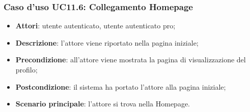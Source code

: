 \subsubsection{Caso d'uso UC11.6: Collegamento Homepage}
\begin{itemize}
\item\textbf{Attori}: utente autenticato, utente autenticato pro;
\item\textbf{Descrizione}: l'attore viene riportato nella pagina iniziale;
\item\textbf{Precondizione}: all'attore viene mostrata la pagina di visualizzazione del profilo;
\item\textbf{Postcondizione}: il sistema ha portato l'attore alla pagina iniziale;
\item\textbf{Scenario principale}: l'attore si trova nella Homepage.
\end{itemize}